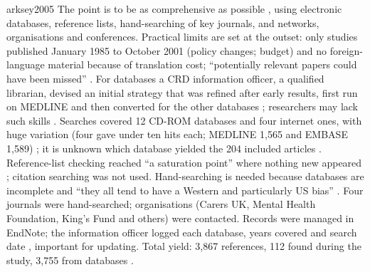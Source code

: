 \begin{papercard}{arksey2005}
 The point is to be as comprehensive as possible , using electronic databases, reference lists, hand-searching of key journals, and networks, organisations and conferences. Practical limits are set at the outset: only studies published January 1985 to October 2001 (policy changes; budget) and no foreign-language material because of translation cost; ``potentially relevant papers could have been missed'' . For databases a CRD information officer, a qualified librarian, devised an initial strategy that was refined after early results, first run on MEDLINE and then converted for the other databases ; researchers may lack such skills . Searches covered 12 CD-ROM databases and four internet ones, with huge variation (four gave under ten hits each; MEDLINE 1,565 and EMBASE 1,589) ; it is unknown which database yielded the 204 included articles . Reference-list checking reached ``a saturation point'' where nothing new appeared ; citation searching was not used. Hand-searching is needed because databases are incomplete and ``they all tend to have a Western and particularly US bias'' . Four journals were hand-searched; organisations (Carers UK, Mental Health Foundation, King's Fund and others) were contacted. Records were managed in EndNote; the information officer logged each database, years covered and search date , important for updating. Total yield: 3,867 references, 112 found during the study, 3,755 from databases .


\end{papercard}

